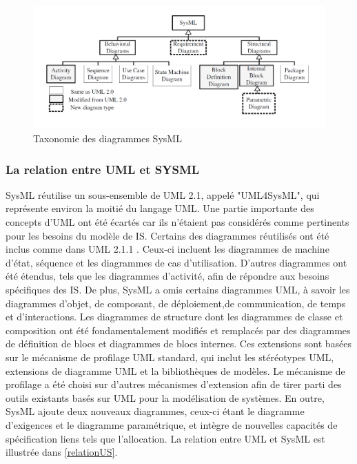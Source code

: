 \documentclass[french]{spimufcphdthesis}
\begin{document}
\begin{figure}[H]
\begin{center}
\includegraphics[scale=0.45]{figures/SysML.png}
\caption{Taxonomie des diagrammes SysML}
\label{SysML_diag}
\end{center}
\end{figure}

\subsubsection{La relation entre UML et SYSML}

 SysML réutilise un sous-ensemble de UML 2.1, appelé "UML4SysML", qui représente environ la moitié du langage UML. Une partie importante des concepts d'UML ont été écartés car ils n'étaient pas considérés comme pertinents pour les besoins du modèle de IS.
Certains des diagrammes réutilisés ont été inclus comme dans UML 2.1.1 .
Ceux-ci incluent les diagrammes de machine d'état, séquence et les diagrammes de cas d'utilisation.
D'autres diagrammes ont été étendus, tels que les diagrammes d'activité, afin de répondre aux besoins spécifiques des IS.
De plus, SysML a omis certains diagrammes UML, à savoir les diagrammes d'objet, de composant, de déploiement,de communication, de temps et d'interactions.
Les diagrammes de structure dont les diagrammes de classe et composition ont été fondamentalement modifiés et remplacés par des diagrammes de définition de blocs et diagrammes de blocs internes. Ces extensions sont basées sur le mécanisme de profilage UML standard, qui inclut les stéréotypes UML, extensions de diagramme UML et la bibliothèques de modèles. Le mécanisme de profilage a été choisi sur d'autres mécanismes d'extension afin de tirer parti des outils existants basés sur UML pour la modélisation de systèmes. En outre, SysML ajoute deux nouveaux diagrammes, ceux-ci étant le diagramme d'exigences et le diagramme paramétrique, et intègre de nouvelles capacités de spécification liens tels que l'allocation. La relation entre UML et SysML est illustrée dans \ref{relationUS}.
\end{document}
